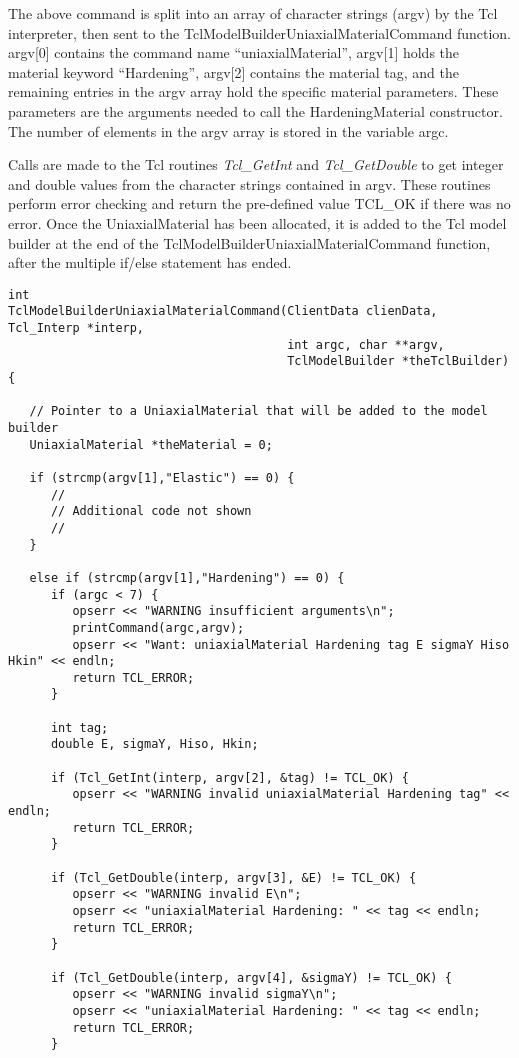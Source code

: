 \documentclass[12pt]{article}
\begin{document}
{The above command is split into an array of character strings (argv) by the Tcl
interpreter, then sent to the \p TclModelBuilderUniaxialMaterialCommand function.
argv[0] contains the command name ``uniaxialMaterial'', argv[1] holds the material keyword
``Hardening'', argv[2] contains the material tag, and the remaining entries in the
argv array hold the specific material parameters. These parameters are the arguments
needed to call the HardeningMaterial constructor. The number of elements in the argv
array is stored in the variable argc.

Calls are made to the Tcl routines {\em Tcl\_GetInt} and {\em Tcl\_GetDouble} to get
integer and double values from the character strings contained in argv. These routines
perform error checking and return the pre-defined value TCL\_OK if there was no error.
Once the UniaxialMaterial has been allocated, it is added to the Tcl model
builder at the end of the \p TclModelBuilderUniaxialMaterialCommand function, after
the multiple if/else statement has ended.

{\sf\small
\begin{verbatim}
int
TclModelBuilderUniaxialMaterialCommand(ClientData clienData, Tcl_Interp *interp,
                                       int argc, char **argv,
                                       TclModelBuilder *theTclBuilder)
{

   // Pointer to a UniaxialMaterial that will be added to the model builder
   UniaxialMaterial *theMaterial = 0;

   if (strcmp(argv[1],"Elastic") == 0) {
      //
      // Additional code not shown
      //
   }

   else if (strcmp(argv[1],"Hardening") == 0) {
      if (argc < 7) {
         opserr << "WARNING insufficient arguments\n";
         printCommand(argc,argv);
         opserr << "Want: uniaxialMaterial Hardening tag E sigmaY Hiso Hkin" << endln;
         return TCL_ERROR;
      }

      int tag;
      double E, sigmaY, Hiso, Hkin;

      if (Tcl_GetInt(interp, argv[2], &tag) != TCL_OK) {
         opserr << "WARNING invalid uniaxialMaterial Hardening tag" << endln;
         return TCL_ERROR;		
      }

      if (Tcl_GetDouble(interp, argv[3], &E) != TCL_OK) {
         opserr << "WARNING invalid E\n";
         opserr << "uniaxialMaterial Hardening: " << tag << endln;
         return TCL_ERROR;	
      }

      if (Tcl_GetDouble(interp, argv[4], &sigmaY) != TCL_OK) {
         opserr << "WARNING invalid sigmaY\n";
         opserr << "uniaxialMaterial Hardening: " << tag << endln;
         return TCL_ERROR;
      }


\end{verbatim}}}
\end{document}

